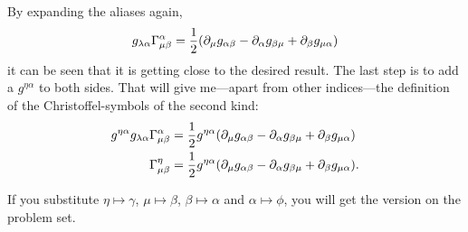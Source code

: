 By expanding the aliases again,
\[
    g_{\lambda\alpha} \Gamma^{\alpha}_{{\mu}{\beta}} = \frac12 (\partial_\mu g_{\alpha\beta} - \partial_\alpha g_{\beta\mu} + \partial_\beta g_{\mu\alpha})
\]
it can be seen that it is getting close to the desired result. The last step is
to add a $g^{\eta\alpha}$ to both sides. That will give me—apart from other
indices—the definition of the Christoffel-symbols of the second kind:
\begin{align*}
    g^{\eta\alpha} g_{\lambda\alpha} \Gamma^{\alpha}_{{\mu}{\beta}} &= \frac12
    g^{\eta\alpha} (\partial_\mu g_{\alpha\beta} - \partial_\alpha g_{\beta\mu}
    + \partial_\beta g_{\mu\alpha}) \\ 
    \Gamma^{\eta}_{{\mu}{\beta}} &= \frac12
    g^{\eta\alpha} (\partial_\mu g_{\alpha\beta} - \partial_\alpha g_{\beta\mu}
    + \partial_\beta g_{\mu\alpha}).
\end{align*}

If you substitute $\eta\mapsto\gamma$, $\mu\mapsto\beta$, $\beta\mapsto\alpha$
and $\alpha\mapsto\phi$, you will get the version on the problem set.


\IfFileExists{\bibliographyfile}{
    \printbibliography
}{}



